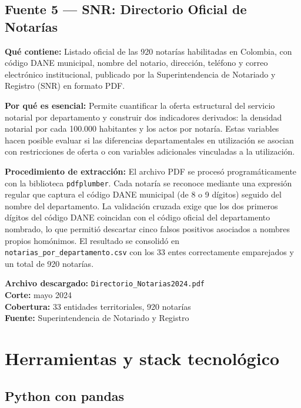 \documentclass{article}
\begin{document}
\subsection{Fuente 5 — SNR: Directorio Oficial de Notarías}

\textbf{Qué contiene:} Listado oficial de las 920 notarías habilitadas
en Colombia, con código DANE municipal, nombre del notario, dirección,
teléfono y correo electrónico institucional, publicado por la
Superintendencia de Notariado y Registro (SNR) en formato PDF.

\textbf{Por qué es esencial:} Permite cuantificar la oferta estructural
del servicio notarial por departamento y construir dos indicadores
derivados: la densidad notarial por cada 100.000 habitantes y los actos
por notaría. Estas variables hacen posible evaluar si las diferencias
departamentales en utilización se asocian con restricciones de oferta o
con variables adicionales vinculadas a la utilización.

\textbf{Procedimiento de extracción:} El archivo PDF se procesó
programáticamente con la biblioteca \texttt{pdfplumber}. Cada notaría
se reconoce mediante una expresión regular que captura el código DANE
municipal (de 8 o 9 dígitos) seguido del nombre del departamento.
La validación cruzada exige que los dos primeros dígitos del código DANE
coincidan con el código oficial del departamento nombrado, lo que
permitió descartar cinco falsos positivos asociados a nombres propios
homónimos. El resultado se consolidó en
\texttt{notarias\_por\_departamento.csv} con los 33 entes correctamente
emparejados y un total de 920 notarías.

\textbf{Archivo descargado:} \texttt{Directorio\_Notarias2024.pdf}\\
\textbf{Corte:} mayo 2024\\
\textbf{Cobertura:} 33 entidades territoriales, 920 notarías\\
\textbf{Fuente:} Superintendencia de Notariado y Registro

\newpage
\section{Herramientas y stack tecnológico}

\subsection{Python con pandas}
\end{document}
